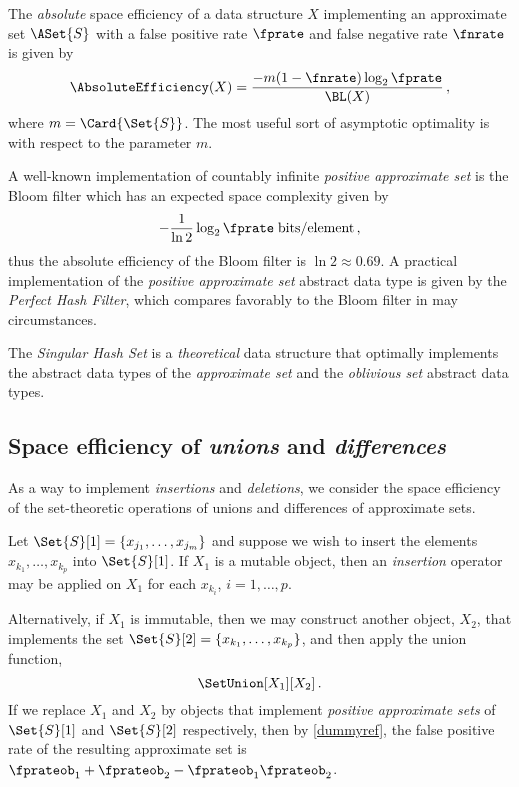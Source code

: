\documentclass[ ../main.tex]{subfiles}
\begin{document}
The \emph{absolute} space efficiency of a data structure $X$ implementing an 
approximate set $\ASet{S}$ with a false positive rate $\fprate$ and false 
negative rate $\fnrate$ is given by
\begin{equation}
    \AbsoluteEfficiency(X) = \frac{-m(1 - \fnrate)\log_2 \fprate}{\BL(X)}\,,
\end{equation}
where $m = \Card{\Set{S}}$. The most useful sort of asymptotic optimality is 
with respect to the parameter $m$.

A well-known implementation of countably infinite \emph{positive approximate 
set} is the Bloom filter\cite{bf} which has an expected space complexity given 
by
\begin{equation}
    -\frac{1}{\ln 2} \log_2 \fprate \; \si{bits \per element}\,,
\end{equation}
thus the absolute efficiency of the Bloom filter is $\ln 2 \approx 0.69$. 
A practical implementation of the \emph{positive approximate set} abstract data 
type is given by the \emph{Perfect Hash Filter}\cite{phf}, which compares 
favorably to the Bloom filter in may circumstances.

The \emph{Singular Hash Set}\cite{shs} is a \emph{theoretical} data structure 
that optimally implements the abstract data types of the \emph{approximate set} 
and the \emph{oblivious set}\cite{obset} abstract data types.

\subsection{Space efficiency of \emph{unions} and \emph{differences}}
As a way to implement \emph{insertions} and \emph{deletions}, we consider the 
space efficiency of the set-theoretic operations of unions and differences of 
approximate sets.

Let $\Set{S}[1] = \{x_{j_1}, \ldots, x_{j_m}\}$ and suppose we wish to insert 
the elements $x_{k_1},\ldots,x_{k_p}$ into $\Set{S}[1]$. If $X_1$ is a mutable 
object, then an \emph{insertion} operator may be applied on $X_1$ for each 
$x_{k_i}$, $i=1,\ldots, p$.

Alternatively, if $X_1$ is immutable, then we may construct another object, 
$X_2$, that implements the set $\Set{S}[2] = \{x_{k_1},\ldots, x_{k_p}\}$, and 
then apply the union function,
\begin{equation}
    \SetUnion[X_1][X_2]\,.
\end{equation}
If we replace $X_1$ and $X_2$ by objects that implement \emph{positive 
approximate sets} of $\Set{S}[1]$ and $\Set{S}[2]$ respectively, then by 
\cref{dummyref}, the false positive rate of the resulting approximate set is 
$\fprateob_1 + \fprateob_2 - \fprateob_1 \fprateob_2$.
\end{document}
